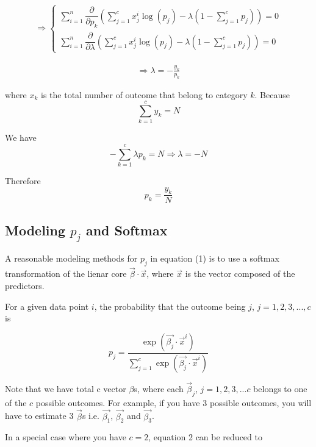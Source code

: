 \documentclass[12pt, oneside]{article}
\begin{document}
\begin{align*}
\Rightarrow
\begin{cases}
\sum\limits_{i=1}^n\dfrac{\partial}{\partial p_k} \left(\sum\limits_{j=1}^c x_j^i \log(p_j)-\lambda (1-\sum\limits_{j=1}^c p_j)\right)=0\\
\sum\limits_{i=1}^n\dfrac{\partial}{\partial \lambda} \left(\sum\limits_{j=1}^c x_j^i \log(p_j)-\lambda (1-\sum\limits_{j=1}^c p_j)\right)=0
\end{cases}
\end{align*}


\begin{align*}
\Rightarrow
\lambda=-\frac{y_k}{p_k}
\end{align*}

where $x_k$ is the total number of outcome that belong to category $k$. Because
\begin{equation*}
\sum\limits_{k=1}^c y_k=N
\end{equation*}

We have 
\begin{equation*}
-\sum\limits_{k=1}^c\lambda p_k=N \Rightarrow \lambda=-N
\end{equation*}

Therefore
\begin{equation*}
p_k=\frac{y_k}{N}
\end{equation*}


\subsection{Modeling $p_j$ and Softmax }
A reasonable modeling methods for $p_j$ in equation (1) is to use a softmax transformation of the lienar core $\vec{\beta}\cdot\vec{x}$, where $\vec{x}$ is the vector composed of the predictors.

For a given data point $i$, the probability that the outcome being $j$, $j=1, 2, 3, ..., c$ is

\begin{equation}
p_j=\frac{\exp{(\vec{\beta_j}\cdot\vec{x}^i)}}{\sum\limits_{j=1}^c\exp{(\vec{\beta_j}\cdot\vec{x}^i)}}
\end{equation}

Note that we have total c vector $\beta$s, where each $\vec{\beta}_j$, $j=1,2, 3, ...c$ belongs to one of the $c$ possible outcomes. For example, if you have 3 possible outcomes, you will have to estimate 3 $\vec{\beta}$s i.e. $\vec{\beta_1}$, $\vec{\beta_2}$ and $\vec{\beta_3}$.  

In a special case where you have $c=2$, equation 2 can be reduced to 
\end{document}
